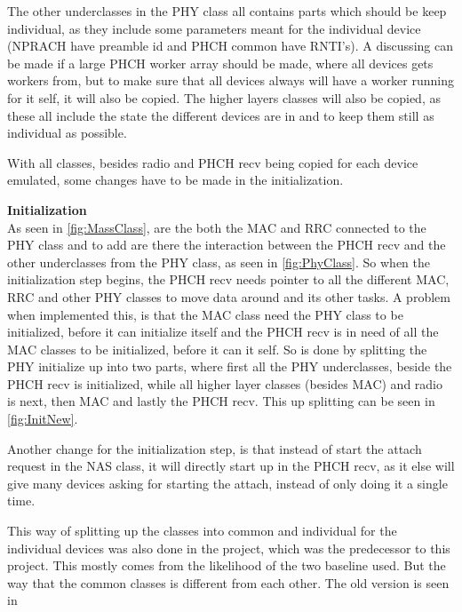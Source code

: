 The other underclasses in the PHY class all contains parts which should be keep individual, as they include some parameters meant for the individual device (NPRACH have preamble id and PHCH common have RNTI's). A discussing can be made if a large PHCH worker array should be made, where all devices gets workers from, but to make sure that all devices always will have a worker running for it self, it will also be copied. The higher layers classes will also be copied, as these all include the state the different devices are in and to keep them still as individual as possible. 

With all classes, besides radio and PHCH recv being copied for each device emulated, some changes have to be made in the initialization.

\textbf{Initialization}\\
As seen in \autoref{fig:MassClass}, are the both the MAC and RRC connected to the PHY class and to add are there the interaction between the PHCH recv and the other underclasses from the PHY class, as seen in \autoref{fig:PhyClass}. So when the initialization step begins, the PHCH recv needs pointer to all the different MAC, RRC and other PHY classes to move data around and its other tasks. A problem when implemented this, is that the MAC class need the PHY class to be initialized, before it can initialize itself and the PHCH recv is in need of all the MAC classes to be initialized, before it can it self. So is done by splitting the PHY initialize up into two parts, where first all the PHY underclasses, beside the PHCH recv is initialized, while all higher layer classes (besides MAC) and radio is next, then MAC and lastly the PHCH recv. This up splitting can be seen in \autoref{fig:InitNew}.


Another change for the initialization step, is that instead of start the attach request in the NAS class, it will directly start up in the PHCH recv, as it else will give many devices asking for starting the attach, instead of only doing it a single time.

This way of splitting up the classes into common and individual for the individual devices was also done in the project, which was the predecessor to this project. This mostly comes from the likelihood of the two baseline used. But the way that the common classes is different from each other. The old version is seen in %

